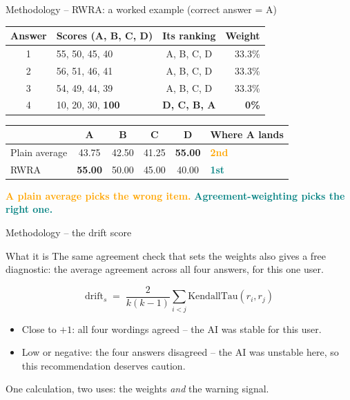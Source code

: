 \documentclass[aspectratio=169,12pt]{beamer}
\newcommand{\key}[1]{\textcolor{Teal}{\textbf{#1}}}
\newcommand{\warn}[1]{\textcolor{Orange}{\textbf{#1}}}
\begin{document}
\begin{frame}{Methodology -- RWRA: a worked example (correct answer = A)}
\small
\begin{table}
\centering
\begin{tabular}{clcr}
\toprule
\textbf{Answer} & \textbf{Scores (A, B, C, D)} & \textbf{Its ranking} & \textbf{Weight}\\
\midrule
1 & 55, 50, 45, 40 & A, B, C, D & 33.3\%\\
2 & 56, 51, 46, 41 & A, B, C, D & 33.3\%\\
3 & 54, 49, 44, 39 & A, B, C, D & 33.3\%\\
4 & 10, 20, 30, \textbf{100} & \textbf{D, C, B, A} & \textbf{0\%}\\
\bottomrule
\end{tabular}
\end{table}

\vspace{0.2em}
\begin{table}
\centering
\begin{tabular}{lccccl}
\toprule
& \textbf{A} & \textbf{B} & \textbf{C} & \textbf{D} & \textbf{Where A lands}\\
\midrule
Plain average & 43.75 & 42.50 & 41.25 & \textbf{55.00} & \warn{2nd}\\
RWRA & \textbf{55.00} & 50.00 & 45.00 & 40.00 & \key{1st}\\
\bottomrule
\end{tabular}
\end{table}

\vspace{0.3em}
\centering
\textcolor{Orange}{\textbf{A plain average picks the wrong item.}}\quad
\textcolor{Teal}{\textbf{Agreement-weighting picks the right one.}}
\end{frame}

\begin{frame}{Methodology -- the drift score}
\begin{block}{What it is}
The same agreement check that sets the weights also gives a free
diagnostic: the average agreement across all four answers, for this one
user.
\end{block}

\vspace{0.7em}
\[
\text{drift}_s \;=\; \frac{2}{k(k-1)}\sum_{i<j} \mathrm{KendallTau}(r_i, r_j)
\]

\vspace{0.7em}
\begin{itemize}
  \item Close to $+1$: all four wordings agreed -- the AI was stable for
        this user.
  \item Low or negative: the four answers disagreed -- the AI was unstable
        here, so this recommendation deserves caution.
\end{itemize}

\vspace{0.4em}
\centering
\textcolor{DeepBlue}{One calculation, two uses: the weights \emph{and} the warning signal.}
\end{frame}
\end{document}
